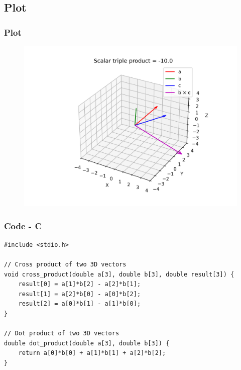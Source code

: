 \documentclass{beamer}
\theoremstyle{remark}
\numberwithin{equation}{section}
\begin{document}
\subsection{Plot}
\begin{frame}
    \frametitle{Plot}
\begin{figure}[H]
   \centering
   \includegraphics[width=0.9\columnwidth]{figs/triple_product.png}
   \end{figure}
\end{frame}

\begin{frame}[fragile]
    \frametitle{Code - C}
    \begin{lstlisting}
#include <stdio.h>

// Cross product of two 3D vectors
void cross_product(double a[3], double b[3], double result[3]) {
    result[0] = a[1]*b[2] - a[2]*b[1];
    result[1] = a[2]*b[0] - a[0]*b[2];
    result[2] = a[0]*b[1] - a[1]*b[0];
}

// Dot product of two 3D vectors
double dot_product(double a[3], double b[3]) {
    return a[0]*b[0] + a[1]*b[1] + a[2]*b[2];
}

\end{lstlisting}
\end{frame}
\end{document}
